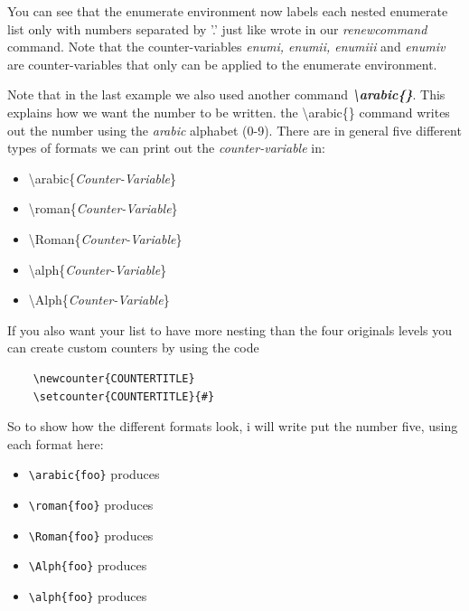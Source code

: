 \documentclass{article}
\newcommand{\bs}[1]{\textbackslash{}#1} %
\begin{document}
You can see that the enumerate environment now labels each nested enumerate list only with numbers separated by '.' just like wrote in our \textit{renewcommand} command.
Note that the counter-variables \textit{enumi, enumii, enumiii} and \textit{enumiv} are counter-variables that only can be applied to the enumerate environment.

Note that in the last example we also used another command \textbf{\textit{\bs{arabic\{\}}}}. This explains how we want the number to be written.
the \bs{arabic\{\}} command writes out the number using the \textit{arabic} alphabet (0-9). There are in general five different types of formats we can print out the \textit{counter-variable}
in:
\begin{itemize}
    \item \bs{arabic\{\textit{Counter-Variable}\}}
    \item \bs{roman\{\textit{Counter-Variable}\}}
    \item \bs{Roman\{\textit{Counter-Variable}\}}
    \item \bs{alph\{\textit{Counter-Variable}\}}
    \item \bs{Alph\{\textit{Counter-Variable}\}}
\end{itemize}

If you also want your list to have more nesting than the four originals levels you can create custom counters by using the code
\begin{center}
    \begin{verbatim}
    \newcounter{COUNTERTITLE}    
    \setcounter{COUNTERTITLE}{#}
    \end{verbatim}
\end{center}

So to show how the different formats look, i will write put the number five, using each format here:

\begin{itemize}
    \item \verb|\arabic{foo}| produces 
    \item \verb|\roman{foo}| produces  
    \item \verb|\Roman{foo}| produces 
    \item \verb|\Alph{foo}| produces 
    \item \verb|\alph{foo}| produces 
\end{itemize}
    
\end{document}
